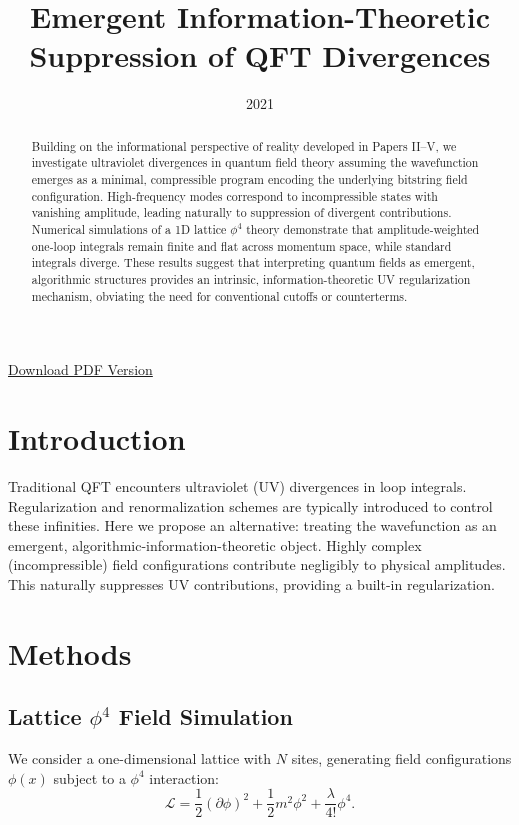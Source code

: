 \documentclass[11pt]{article}
\title{Emergent Information-Theoretic Suppression of QFT Divergences}
\date{2021}
\begin{document}
\maketitle

\begin{abstract}
  Building on the informational perspective of reality developed in Papers II–V, we investigate ultraviolet divergences in quantum field theory assuming the wavefunction emerges as a minimal, compressible program encoding the underlying bitstring field configuration. 
  High-frequency modes correspond to incompressible states with vanishing amplitude, leading naturally to suppression of divergent contributions.
  Numerical simulations of a 1D lattice $\phi^4$ theory demonstrate that amplitude-weighted one-loop integrals remain finite and flat across momentum space, while standard integrals diverge.
  These results suggest that interpreting quantum fields as emergent, algorithmic structures provides an intrinsic, information-theoretic UV regularization mechanism, obviating the need for conventional cutoffs or counterterms. 
\end{abstract}


\ifdefined\ishtml
\begin{center}
\small \href{qft-divergences.pdf}{Download PDF Version}
\end{center}
\fi


\section{Introduction}
Traditional QFT encounters ultraviolet (UV) divergences in loop integrals. Regularization and renormalization schemes are typically introduced to control these infinities. Here we propose an alternative: treating the wavefunction as an emergent, algorithmic-information-theoretic object. Highly complex (incompressible) field configurations contribute negligibly to physical amplitudes. This naturally suppresses UV contributions, providing a built-in regularization.

\section{Methods}
\subsection{Lattice \(\phi^4\) Field Simulation}
We consider a one-dimensional lattice with \(N\)  sites, generating field configurations \(\phi(x)\)  subject to a \(\phi^4\)  interaction:
\begin{equation}
\mathcal{L} = \frac{1}{2} (\partial \phi)^2 + \frac{1}{2} m^2 \phi^2 + \frac{\lambda}{4!} \phi^4.
\end{equation}
\end{document}
